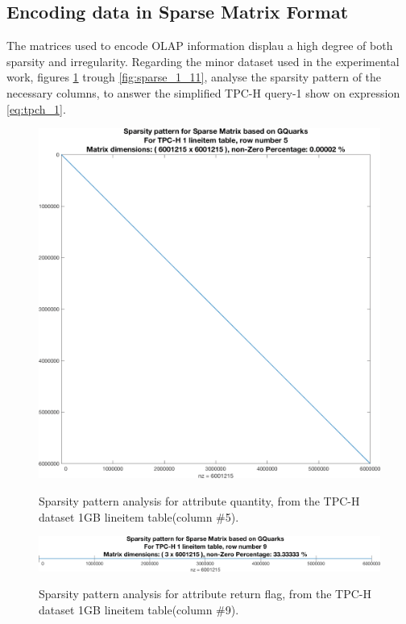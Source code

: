  

\subsection{Encoding data in Sparse Matrix Format}
\label{matrix_format}
The matrices used to encode OLAP information displau a high degree of both sparsity and irregularity. Regarding the minor dataset used in the experimental work, figures \ref{fig:sparse_1_5} trough \ref{fig:sparse_1_11}, analyse the sparsity pattern of the necessary columns, to answer the simplified TPC-H query-1 show on expression \ref{eq:tpch_1}.


\begin{figure}[H]
\centering
\caption{Sparsity pattern analysis for attribute quantity, from the TPC-H dataset 1GB lineitem table(column \#5).}
\includegraphics[width=1\columnwidth]{eps/sparsity_5.png}
\label{fig:sparse_1_5}
\end{figure}

\vspace{1.5cm}
\begin{figure}[H]
\centering
\caption{Sparsity pattern analysis for attribute return flag, from the TPC-H dataset 1GB lineitem table(column \#9).}
\includegraphics[width=1\columnwidth]{eps/sparsity_9.png}
\label{fig:sparse_1_9}
\end{figure}
\vspace{1.5cm}

